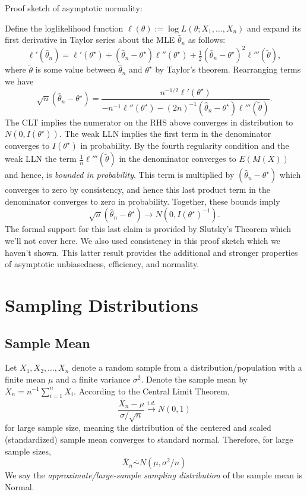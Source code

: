 \documentclass[
]{book}
\begin{document}
Proof sketch of asymptotic normality:

Define the loglikelihood function \(\ell(\theta):=\log L(\theta;X_1, \ldots, X_n)\) and expand its first derivative in Taylor series about the MLE \(\hat\theta_n\) as follows:
\[\ell'(\hat\theta_n) = \ell'(\theta^\star) + (\hat\theta_n - \theta^\star)\ell''(\theta^\star) + \tfrac12(\hat\theta_n - \theta^\star)^2\ell'''(\tilde\theta),\]
where \(\tilde\theta\) is some value between \(\hat\theta_n\) and \(\theta^\star\) by Taylor's theorem. Rearranging terms we have
\[\sqrt{n}(\hat\theta_n - \theta^\star) = \frac{n^{-1/2}\ell'(\theta^\star)}{-n^{-1}\ell''(\theta^\star) - (2n)^{-1}(\hat\theta_n-\theta^\star)\ell'''(\tilde\theta)}.\]
The CLT implies the numerator on the RHS above converges in distribution to \(N(0, I(\theta^\star))\). The weak LLN implies the first term in the denominator converges to \(I(\theta^\star)\) in probability. By the fourth regularity condition and the weak LLN the term \(\tfrac1n \ell'''(\tilde\theta)\) in the denominator converges to \(E(M(X))\) and hence, is \emph{bounded in probability}. This term is multiplied by \((\hat\theta_n - \theta^\star)\) which converges to zero by consistency, and hence this last product term in the denominator converges to zero in probability. Together, these bounds imply
\[\sqrt{n}(\hat\theta_n - \theta^\star)\rightarrow N(0,I(\theta^\star)^{-1}).\]
The formal support for this last claim is provided by Slutsky's Theorem which we'll not cover here. We also used consistency in this proof sketch which we haven't shown. This latter result provides the additional and stronger properties of asymptotic unbiasedness, efficiency, and normality.

\hypertarget{sampling-distributions}{%
\chapter{Sampling Distributions}\label{sampling-distributions}}

\hypertarget{sample-mean}{%
\section{Sample Mean}\label{sample-mean}}

Let \(X_1, X_2, \ldots, X_n\) denote a random sample from a distribution/population with a finite mean \(\mu\) and a finite variance \(\sigma^2\). Denote the sample mean by \(\overline X_n = n^{-1}\sum_{i=1}^n X_i\). According to the Central Limit Theorem,
\[\frac{\overline X_n - \mu}{\sigma / \sqrt{n}} \stackrel{i.d.}{\rightarrow} N(0,1)\]
for large sample size, meaning the distribution of the centered and scaled (standardized) sample mean converges to standard normal. Therefore, for large sample sizes,
\[\overline X_n \stackrel{\cdot}{\sim} N(\mu, \sigma^2/n)\]
We say the \emph{approximate/large-sample sampling distribution} of the sample mean is Normal.
\end{document}
